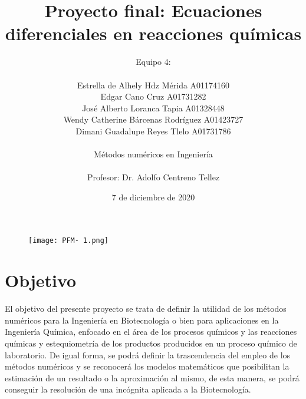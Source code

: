 \documentclass{article}
\begin{document}
\begin{titlepage}

\title{Proyecto final: Ecuaciones diferenciales en reacciones químicas}
\author{Equipo 4: \\
\\Estrella de Alhely Hdz Mérida A01174160 
\\Edgar Cano Cruz A01731282
\\José Alberto Loranca Tapia A01328448
\\Wendy Catherine Bárcenas Rodríguez A01423727
\\Dimani Guadalupe Reyes Tlelo A01731786
\\ \\Métodos numéricos en Ingeniería
\\ \\ Profesor: Dr. Adolfo Centreno Tellez
 }
\date{7 de diciembre de 2020}
\end{titlepage}
\begin{figure}[t!]
\centering
\texttt{[image: PFM- 1.png]}
\end{figure}
\maketitle
\newpage



\section{Objetivo}
El objetivo del presente proyecto se trata de definir la utilidad de los métodos numéricos para la Ingeniería en Biotecnología o bien para aplicaciones en la Ingeniería Química, enfocado en el área de los procesos químicos y las reacciones químicas y estequiometría de los productos producidos en un proceso químico de laboratorio. De igual forma, se podrá definir la trascendencia del empleo de los métodos numéricos y se reconocerá los modelos matemáticos que posibilitan la estimación de un resultado o la aproximación al mismo, de esta manera, se podrá conseguir la resolución de una incógnita aplicada a la Biotecnología.
\end{document}
